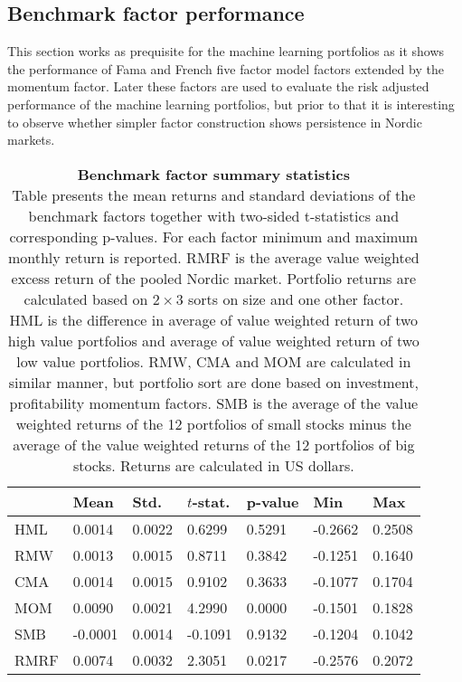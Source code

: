 \documentclass{article}
\begin{document}
\subsection{Benchmark factor performance}\label{BenchmarkFactorPerformance}

This section works as prequisite for the machine learning portfolios as it shows the performance of Fama and French five factor \citeyear{FAMA20151} model factors extended by the momentum factor.  Later these factors are used to evaluate the risk adjusted performance of the machine learning portfolios, but prior to that it is interesting to observe whether simpler factor construction shows persistence in Nordic markets. 

\begin{table}[h]
\small
\caption[Benchmark factor summary statistics]{\textbf{Benchmark factor summary statistics} \\ Table presents the mean returns and standard deviations of the benchmark factors together with two-sided t-statistics and corresponding p-values. For each factor minimum and maximum monthly return is reported.  RMRF is the average value weighted excess return of the pooled Nordic market. Portfolio returns are calculated based on $2 \times 3$ sorts on size and one other factor. HML is the difference in average of value weighted return of two high value portfolios and average of value weighted return of two low value portfolios. RMW, CMA and MOM are calculated in similar manner, but portfolio sort are done based on investment, profitability momentum factors. SMB is the average of the value weighted returns of the 12 portfolios of small stocks minus the average of the value weighted returns of the 12 portfolios of big stocks. Returns are calculated in US dollars.}
\label{table:variableFFfactors}
\centering
{}
\begin{tabularx}{\textwidth}{@{\extracolsep{4pt}} X Y Y Y Y Y Y} 
\toprule
& Mean & Std. & $t$-stat. & p-value & Min & Max \\
\midrule
HML & 0.0014 & 0.0022 & 0.6299 & 0.5291 & -0.2662 & 0.2508 \\
RMW & 0.0013 & 0.0015 & 0.8711 & 0.3842 & -0.1251 & 0.1640 \\
CMA & 0.0014 & 0.0015 & 0.9102 & 0.3633 & -0.1077 & 0.1704 \\
MOM & 0.0090 & 0.0021 & 4.2990 & 0.0000 & -0.1501 & 0.1828 \\
SMB & -0.0001 & 0.0014 & -0.1091 & 0.9132 & -0.1204 & 0.1042 \\
RMRF & 0.0074 & 0.0032 & 2.3051 & 0.0217 & -0.2576 & 0.2072 \\
\bottomrule
\end{tabularx}
\end{table}
\end{document}
